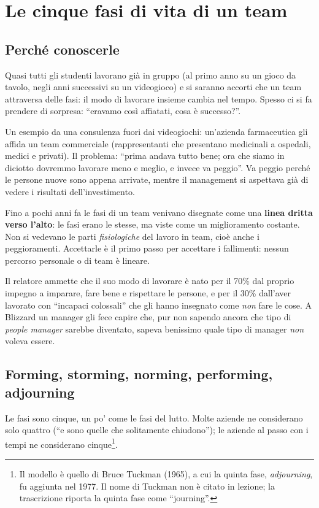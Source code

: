 \section{Le cinque fasi di vita di un team}
\label{sec:z1-fasi-team}

\subsection{Perché conoscerle}

Quasi tutti gli studenti lavorano già in gruppo (al primo anno su un gioco da
tavolo, negli anni successivi su un videogioco) e si saranno accorti che un
team attraversa delle fasi: il modo di lavorare insieme cambia nel tempo.
Spesso ci si fa prendere di sorpresa: ``eravamo così affiatati, cosa è
successo?''.

Un esempio da una consulenza fuori dai videogiochi: un'azienda farmaceutica
gli affida un team commerciale (rappresentanti che presentano medicinali a
ospedali, medici e privati). Il problema: ``prima andava tutto bene; ora che
siamo in diciotto dovremmo lavorare meno e meglio, e invece va peggio''. Va
peggio perché le persone nuove sono appena arrivate, mentre il management si
aspettava già di vedere i risultati dell'investimento.

Fino a pochi anni fa le fasi di un team venivano disegnate come una
\textbf{linea dritta verso l'alto}: le fasi erano le stesse, ma viste come un
miglioramento costante. Non si vedevano le parti \emph{fisiologiche} del
lavoro in team, cioè anche i peggioramenti. Accettarle è il primo passo per
accettare i fallimenti: nessun percorso personale o di team è lineare.

Il relatore ammette che il suo modo di lavorare è nato per il 70\% dal
proprio impegno a imparare, fare bene e rispettare le persone, e per il 30\%
dall'aver lavorato con ``incapaci colossali'' che gli hanno insegnato come
\emph{non} fare le cose. A Blizzard un manager gli fece capire che, pur non
sapendo ancora che tipo di \emph{people manager} sarebbe diventato, sapeva
benissimo quale tipo di manager \emph{non} voleva essere.

\subsection{Forming, storming, norming, performing, adjourning}

Le fasi sono cinque, un po' come le fasi del lutto. Molte aziende ne
considerano solo quattro (``e sono quelle che solitamente chiudono''); le
aziende al passo con i tempi ne considerano cinque\footnote{Il modello è
quello di Bruce Tuckman (1965), a cui la quinta fase, \emph{adjourning}, fu
aggiunta nel 1977. Il nome di Tuckman non è citato in lezione; la
trascrizione riporta la quinta fase come ``journing''.}.

